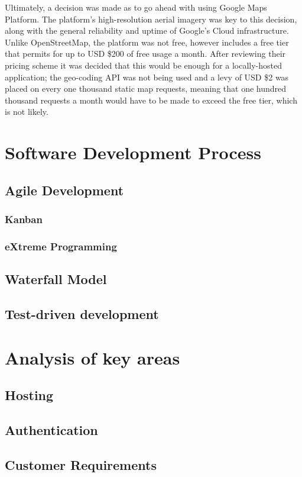 Ultimately, a decision was made as to go ahead with using Google Maps Platform. The platform's high-resolution aerial imagery was key to this decision, along with the general reliability and uptime of Google's Cloud infrastructure. Unlike OpenStreetMap, the platform was not free, however includes a free tier that permits for up to USD \$200 of free usage a month. After reviewing their pricing scheme it was decided that this would be enough for a locally-hosted application; the geo-coding API was not being used and a levy of USD \$2 was placed on every one thousand static map requests, meaning that one hundred thousand requests a month would have to be made to exceed the free tier, which is not likely.

\section{Software Development Process}

\subsection{Agile Development}

\subsubsection{Kanban}

\subsubsection{eXtreme Programming}

\subsection{Waterfall Model}

\subsection{Test-driven development}

\section{Analysis of key areas}

\subsection{Hosting}

\subsection{Authentication}

\subsection{Customer Requirements}

